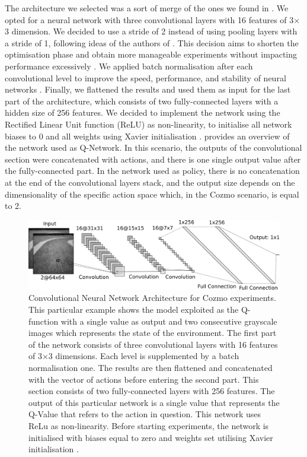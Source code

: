 The architecture we selected was a sort of merge of the ones we found in \cite{kendall2018learning,kendall2019learning,haarnoja2018alg}.
We opted for a neural network with three convolutional layers with 16 features of 3$\times$3 dimension. 
We decided to use a stride of 2 instead of using pooling layers with a stride of 1, following ideas of the authors of \cite{kendall2018learning,kendall2019learning}.
This decision aims to shorten the optimisation phase and obtain more manageable experiments without impacting performance excessively \cite{springenberg2014striving}.
We applied batch normalisation after each convolutional level to improve the speed, performance, and stability of neural networks \cite{ioffe2015batch}.
Finally, we flattened the results and used them as input for the last part of the architecture, which consists of two fully-connected layers with a hidden size of 256 features. 
We decided to implement the network using the Rectified Linear Unit function (ReLU) as non-linearity, to initialise all network biases to 0 and all weights using Xavier initialisation \cite{glorot2010understanding}.
 provides an overview of the network used as Q-Network.
In this scenario, the outputs of the convolutional section were concatenated with actions, and there is one single output value after the fully-connected part.
In the network used as policy, there is no concatenation at the end of the convolutional layers stack, and the output size depends on the dimensionality of the specific action space which, in the Cozmo scenario, is equal to 2.

\begin{figure}

    \centering
    \includegraphics[width=\textwidth]{img/cnn_cozmo.png}
    \caption[Convolutional Neural Network Architecture for Cozmo experiments]{ Convolutional Neural Network Architecture for Cozmo experiments.
    This particular example shows the model exploited as the Q-function with a single value as output and two consecutive grayscale images which represents the state of the environment.
    The first part of the network consists of three convolutional layers with 16 features of 3$\times$3 dimensions. Each level is supplemented by a batch normalisation one.
    The results are then flattened and concatenated with the vector of actions before entering the second part. This section consists of two fully-connected layers with 256 features.
    The output of this particular network is a single value that represents the Q-Value that refers to the action in question.
    This network uses ReLu as non-linearity. Before starting experiments, the network is initialised with biases equal to zero and weights set utilising Xavier initialisation \cite{glorot2010understanding}.}
    \label{fig:cnn_cozmo}
\end{figure}

